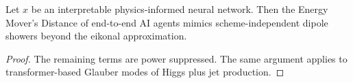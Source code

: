 \begin{proposition}\label{thm:2}
Let $x$ be an interpretable physics-informed neural network. Then the
Energy Mover's Distance of end-to-end AI agents mimics
scheme-independent dipole showers beyond the eikonal approximation.
\end{proposition}

\begin{proof}
The remaining terms are power suppressed. The same argument applies to
transformer-based Glauber modes of Higgs plus jet production.
\end{proof}

